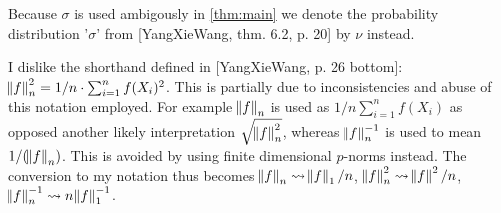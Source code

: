 
Because $\sigma$ is used ambigously in \cref{thm:main}
we denote the probability distribution '$\sigma$'
from [YangXieWang, thm. 6.2, p. 20] by $\nu$ instead.

I dislike the shorthand defined in
[YangXieWang, p. 26 bottom]:
$\norm{f}_n^2 = 1/n \cdot \sum_{i=1}^n f(X_i)^2$.
This is partially due to inconsistencies and abuse of this notation
employed. For example
$\norm{f}_n$ is used as $1/n \sum_{i=1}^n f(X_i)$ as opposed another
likely interpretation $\sqrt{ \norm{f}_n^2 }$, whereas
$\norm{f}_n^{-1}$ is used to mean $1/(\norm{f}_n)$.
This is avoided by using finite dimensional $p$-norms instead.
The conversion to my notation thus becomes
$\norm{f}_n \leadsto \norm{f}_1/n$,
$\norm{f}_n^2 \leadsto \norm{f}^2/n$,
$\norm{f}_n^{-1} \leadsto n \norm{f}_1^{-1}$.
